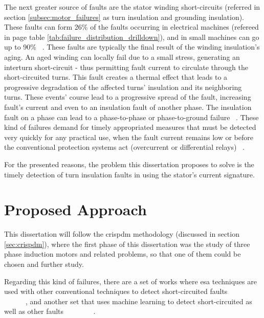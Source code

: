 The next greater source of faults are the stator winding short-circuits (referred in section \ref{subsec:motor_failures} as turn insulation and grounding insulation). These faults can form 26\% of the faults occurring in electrical machines (refereed in page \pageref{tab:failure_distribution_drilldown} table \ref{tab:failure_distribution_drilldown}), and in small machines can go up to 90\% ~\cite{Riera-Guasp2015}. These faults are typically the final result of the winding insulation's aging. An aged winding can locally fail due to a small stress, generating an interturn short-circuit - thus permitting fault current to circulate through the short-circuited turns. This fault creates a thermal effect that leads to a progressive degradation of the affected turns' insulation and its neighboring turns. These events' course lead to a progressive spread of the fault, increasing fault's current and even to an insulation fault of another phase. The insulation fault on a phase can lead to a phase-to-phase or phase-to-ground failure ~\cite{Riera-Guasp2015}. These kind of failures demand for timely appropriated measures that must be detected very quickly for any practical use, when the fault current remains low or before the conventional protection systems act (overcurrent or differential relays) ~\cite{Riera-Guasp2015}.

For the presented reasons, the problem this dissertation proposes to solve is the timely detection of turn insulation faults in  using the stator's current signature.





\section{Proposed Approach} %
\label{sec:proposed_approach}

This dissertation will follow the \acrlong{crispdm} methodology (discussed in section \ref{sec:crispdm}), where the first phase of this dissertation was the study of three phase induction motors and related problems, so that one of them could be chosen and further study. 

Regarding this kind of failures, there are a set of works where \Acrshort{esa} techniques are used with other conventional techniques to detect short-circuited faults ~\cite{Cheng2011} ~\cite{Joksimovic2013} ~\cite{Cruz2001} ~\cite{Cabanas2013} ~\cite{Gandhi2011} ~\cite{Kia2013} ~\cite{M.a2014} ~\cite{Bouzid2013} ~\cite{Bakhri2012}, and another set that uses machine learning to detect short-circuited as well as other faults  ~\cite{Ourici2012} ~\cite{Toma2011} ~\cite{Wolkiewicz2013} ~\cite{Patel2016} ~\cite{Jagadanand2015}.

